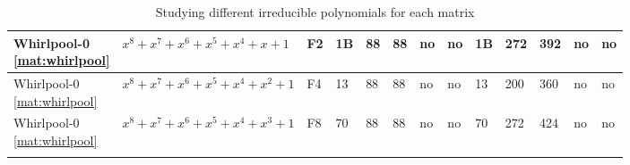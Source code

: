 \begin{tiny}
\begin{longtable}{|l|l|l|l|l|l|l|l|l|l|l|l|l|}
\shortstack{Whirlpool-0 \\ \eqref{mat:whirlpool}} & $x^8 + x^7 + x^6 + x^5 + x^4 + x + 1$ & F2 & 1B & 88 & 88 & no & no & 1B & 272 & 392 & no & no \\ \hline
\shortstack{Whirlpool-0 \\ \eqref{mat:whirlpool}} & $x^8 + x^7 + x^6 + x^5 + x^4 + x^2 + 1$ & F4 & 13 & 88 & 88 & no & no & 13 & 200 & 360 & no & no \\ \hline
\shortstack{Whirlpool-0 \\ \eqref{mat:whirlpool}} & $x^8 + x^7 + x^6 + x^5 + x^4 + x^3 + 1$ & F8 & 70 & 88 & 88 & no & no & 70 & 272 & 424 & no & no \\ \hline
\caption{Studying different irreducible polynomials for each matrix}
\label{tbl:different-poly}\\
\end{longtable}
\end{tiny}
